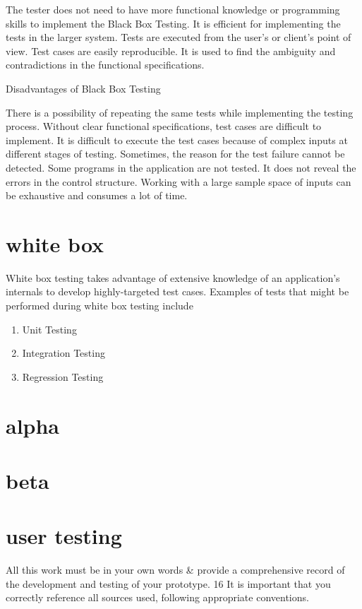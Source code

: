 \documentclass{article}
\begin{document}
The tester does not need to have more functional knowledge or programming skills to implement the Black Box Testing.
It is efficient for implementing the tests in the larger system.
Tests are executed from the user’s or client’s point of view.
Test cases are easily reproducible.
It is used to find the ambiguity and contradictions in the functional specifications.

Disadvantages of Black Box Testing

There is a possibility of repeating the same tests while implementing the testing process.
Without clear functional specifications, test cases are difficult to implement.
It is difficult to execute the test cases because of complex inputs at different stages of testing.
Sometimes, the reason for the test failure cannot be detected.
Some programs in the application are not tested.
It does not reveal the errors in the control structure.
Working with a large sample space of inputs can be exhaustive and consumes a lot of time.


\section{white box}
White box testing takes advantage of extensive knowledge of an application’s internals to develop highly-targeted test cases. Examples of tests that might be performed during white box testing include

\begin{enumerate}
	\item Unit Testing
	\item Integration Testing
	\item Regression Testing
\end{enumerate}

\section{alpha}
\section{beta}
\section{user testing}
All this work must be in your own words \& provide a comprehensive record of the development
and testing of your prototype.
16
It is important that you correctly reference all sources used, following appropriate conventions.
\end{document}
